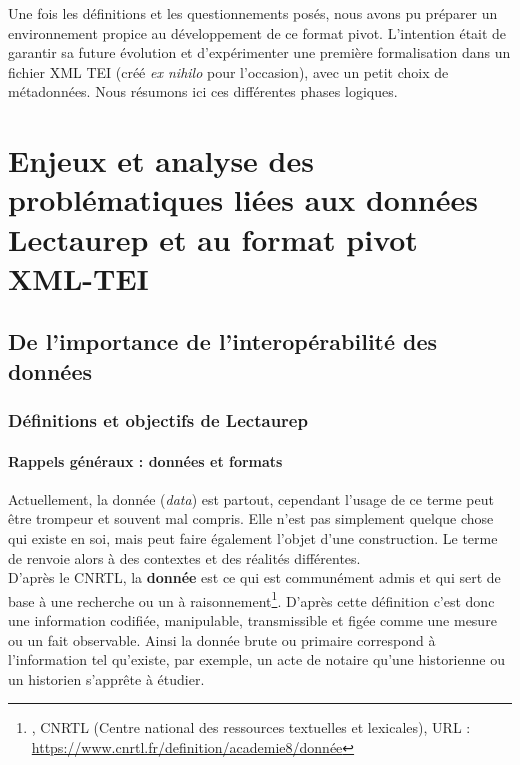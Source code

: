 Une fois les définitions et les questionnements posés, nous avons pu préparer un environnement propice au développement  de ce format pivot. L'intention était de garantir sa future évolution et d'expérimenter une première formalisation dans un fichier XML TEI (créé \textit{ex nihilo} pour l'occasion), avec un petit choix de métadonnées. Nous résumons ici ces différentes phases logiques.
\clearpage
\thispagestyle{empty}
\chapter{Enjeux et analyse des problématiques liées aux données Lectaurep et au format pivot XML-TEI}
\section{De l'importance de l'interopérabilité des données}

\subsection{Définitions et objectifs de Lectaurep}
\subsubsection{Rappels généraux : données et formats}

Actuellement, la donnée (\textit{data}) est partout, cependant l'usage de ce terme peut être trompeur et souvent mal compris. Elle n'est pas simplement quelque chose qui existe en soi, mais peut faire également l'objet d'une construction. Le terme de  renvoie alors à des contextes et des réalités différentes.\\

D'après le CNRTL, la \textbf{donnée} est ce qui est communément admis et qui sert de base à une recherche ou un à raisonnement\footnote{, CNRTL (Centre national des ressources textuelles et lexicales), URL : \url{https://www.cnrtl.fr/definition/academie8/donnée}}. D'après cette définition c'est donc une information codifiée, manipulable, transmissible et figée comme une mesure ou un fait observable. Ainsi la donnée brute ou primaire correspond à l'information tel qu'existe, par exemple, un acte de notaire qu'une historienne ou un historien s'apprête à étudier.\\

